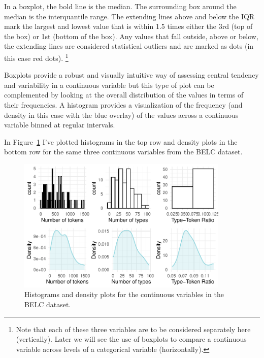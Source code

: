 \documentclass[
  letterpaper,
]{latex/krantz}
\begin{document}
In a boxplot, the bold line is the median. The surrounding box around
the median is the interquantile range. The extending lines above and
below the IQR mark the largest and lowest value that is within 1.5 times
either the 3rd (top of the box) or 1st (bottom of the box). Any values
that fall outside, above or below, the extending lines are considered
statistical outliers and are marked as dots (in this case red dots).
\footnote{Note that each of these three variables are to be considered
  separately here (vertically). Later we will see the use of boxplots to
  compare a continuous variable across levels of a categorical variable
  (horizontally).}

Boxplots provide a robust and visually intuitive way of assessing
central tendency and variability in a continuous variable but this type
of plot can be complemented by looking at the overall distribution of
the values in terms of their frequencies. A histogram provides a
visualization of the frequency (and density in this case with the blue
overlay) of the values across a continuous variable binned at regular
intervals.

In Figure~\ref{fig-summaries-histograms-belc} I've plotted histograms in
the top row and density plots in the bottom row for the same three
continuous variables from the BELC dataset.

\begin{figure}[h]

{\centering \includegraphics[width=0.9\textwidth,height=\textheight]{./approaching-analysis_files/figure-pdf/fig-summaries-histograms-belc-1.pdf}

}

\caption{\label{fig-summaries-histograms-belc}Histograms and density
plots for the continuous variables in the BELC dataset.}

\end{figure}
\end{document}
